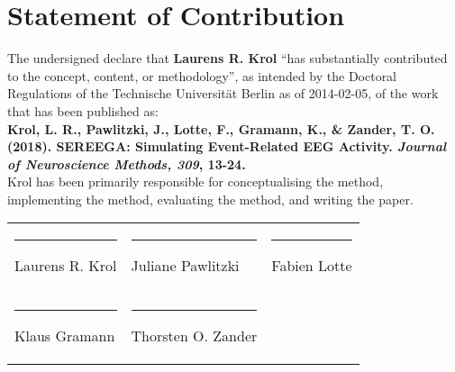 \documentclass[a4paper,12pt]{article}
\title{}
\author{}
\date{}
\begin{document}
\thispagestyle{empty}

\section*{Statement of Contribution}

The undersigned declare that \textbf{Laurens R. Krol} ``has substantially contributed to the concept, content, or methodology'', as intended by the Doctoral Regulations of the Technische Universität Berlin as of 2014-02-05, of the work that has been published as: \\

\textbf{Krol, L. R., Pawlitzki, J., Lotte, F., Gramann, K., \& Zander, T. O. (2018). SEREEGA: Simulating Event-Related EEG Activity. \emph{Journal of Neuroscience Methods, 309}, 13-24.} \\

Krol has been primarily responsible for conceptualising the method, implementing the method, evaluating the method, and writing the paper. \\

\begin{tabularx}{\textwidth}{XXX}
\vspace{2cm} \hrule Laurens R. Krol & \vspace{2cm} \hrule Juliane Pawlitzki & \vspace{2cm} \hrule Fabien Lotte \\
\vspace{2cm} \hrule Klaus Gramann & \vspace{2cm} \hrule Thorsten O. Zander & 
\end{tabularx}
\end{document}
